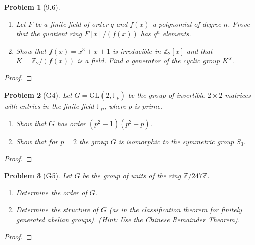 \documentclass[10pt]{article}
\newcommand{\sk}{\vskip 10mm}
\newcommand{\bb}[1]{\mathbb{#1}}
\theoremstyle{plain}
\newtheorem{problem}{Problem}
\theoremstyle{remark}
\begin{document}
\sk


\begin{problem}[9.6]
  \begin{enumerate}
  \item Let $F$ be a finite field of order $q$ and $f(x)$ a polynomial of degree
    $n$. Prove that the quotient ring $F[x]/(f(x))$ has $q^n$ elements.
  \item Show that $f(x)=x^3+x+1$ is irreducible in $\bb{Z}_2[x]$ and that
    $K=\bb{Z}_2/(f(x))$ is a field. Find a generator of the cyclic group
    $K^X$.
  \end{enumerate}
\end{problem}

\begin{proof}
  
\end{proof}

\sk


\begin{problem}[G4]
  Let $G=\text{GL}(2,\bb{F}_p)$ be the group of invertible $2\times 2$ matrices
  with entries in the finite field $\bb{F}_p$, where $p$ is prime.
  \begin{enumerate}
  \item Show that $G$ has order $(p^2-1)(p^2-p)$.
  \item Show that for $p=2$ the group $G$ is isomorphic to the symmetric group
    $S_3$.
  \end{enumerate}
\end{problem}

\begin{proof}
  
\end{proof}

\sk


\begin{problem}[G5]
  Let $G$ be the group of units of the ring $\bb{Z}/247\bb{Z}$.
  \begin{enumerate}
  \item Determine the order of $G$.
  \item Determine the structure of $G$ (as in the classification theorem for
    finitely generated abelian groups).
    (Hint: Use the Chinese Remainder Theorem).
  \end{enumerate}
\end{problem}

\begin{proof}
  
\end{proof}
\end{document}
